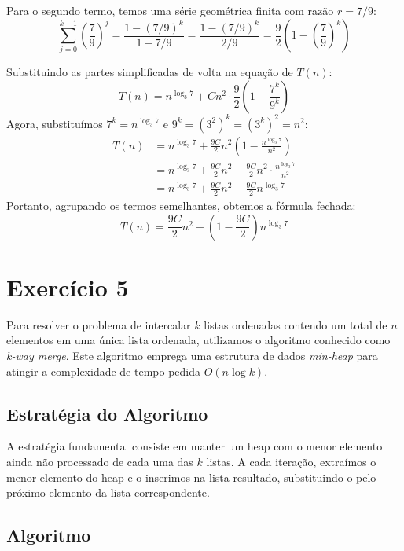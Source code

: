 \documentclass[a4paper,12pt]{article}
\begin{document}
Para o segundo termo, temos uma série geométrica finita com razão $r = 7/9$:
\begin{equation}
\sum_{j=0}^{k-1} \left(\frac{7}{9}\right)^j = \frac{1 - (7/9)^k}{1 - 7/9} = \frac{1 - (7/9)^k}{2/9} = \frac{9}{2}\left(1 - \left(\frac{7}{9}\right)^k\right)
\end{equation}

Substituindo as partes simplificadas de volta na equação de $T(n)$:
\begin{equation}
T(n) = n^{\log_3 7} + Cn^2 \cdot \frac{9}{2}\left(1 - \frac{7^k}{9^k}\right)
\end{equation}
Agora, substituímos $7^k = n^{\log_3 7}$ e $9^k = (3^2)^k = (3^k)^2 = n^2$:
\begin{align*}
T(n) &= n^{\log_3 7} + \frac{9C}{2}n^2 \left(1 - \frac{n^{\log_3 7}}{n^2}\right) \\
     &= n^{\log_3 7} + \frac{9C}{2}n^2 - \frac{9C}{2}n^2 \cdot \frac{n^{\log_3 7}}{n^2} \\
     &= n^{\log_3 7} + \frac{9C}{2}n^2 - \frac{9C}{2}n^{\log_3 7}
\end{align*}
Portanto, agrupando os termos semelhantes, obtemos a fórmula fechada:
\begin{equation}
\boxed{T(n) = \frac{9C}{2}n^2 + \left(1 - \frac{9C}{2}\right)n^{\log_3 7}}
\end{equation}
\newpage
\section*{Exercício 5}

Para resolver o problema de intercalar $k$ listas ordenadas contendo um total de $n$ elementos em uma única lista ordenada, utilizamos o algoritmo conhecido como \textit{k-way merge}. Este algoritmo emprega uma estrutura de dados \textit{min-heap} para atingir a complexidade de tempo pedida $O(n \log k)$.

\subsection*{Estratégia do Algoritmo}

A estratégia fundamental consiste em manter um heap com o menor elemento ainda não processado de cada uma das $k$ listas. A cada iteração, extraímos o menor elemento do heap e o inserimos na lista resultado, substituindo-o pelo próximo elemento da lista correspondente.

\subsection*{Algoritmo}
\end{document}
